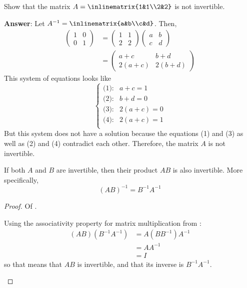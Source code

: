 \begin{exm}
	Show that the matrix $A=\inlinematrix{1&1\\2&2}$ is
	not invertible.
	\begin{flushleft}
		\textbf{Answer}: Let $A^{-1}=\inlinematrix{a&b\\c&d}$.
		Then,
		\begin{align*}
			\begin{pmatrix}
				1 & 0 \\
				0 & 1
			\end{pmatrix} & =
			\begin{pmatrix}
				1 & 1 \\
				2 & 2
			\end{pmatrix}\begin{pmatrix}
				a & b \\
				c & d
			\end{pmatrix}     \\
			                           & =\begin{pmatrix}
				a+c    & b+d    \\
				2(a+c) & 2(b+d)
			\end{pmatrix}
		\end{align*}
		This system of equations looks like
		\begin{equation*}
			\begin{cases}
				\text{(1):} & a+c=1    \\
				\text{(2):} & b+d=0    \\
				\text{(3):} & 2(a+c)=0 \\
				\text{(4):} & 2(a+c)=1 \\
			\end{cases}
		\end{equation*}
		But this system does not have a solution because the equations (1) and (3)
		as well as (2) and (4) contradict each other. Therefore, the matrix $A$
		is not invertible.
	\end{flushleft}
\end{exm}

\begin{thm}\label{thm-product-of-inverse-matrices}
	If both $A$ and $B$ are invertible, then their product $AB$ is also invertible.
	More specifically,
	\begin{equation}
		(AB)^{-1}=B^{-1}A^{-1}
	\end{equation}
\end{thm}

\begin{proof}
	Of .
	\begin{flushleft}
		Using the associativity property for matrix multiplication from
		:
		\begin{align*}
			(AB)(B^{-1}A^{-1}) & =A(BB^{-1})A^{-1} \\
			                   & =AA^{-1}          \\
			                   & =I
		\end{align*}
		so that means that $AB$ is invertible, and that its inverse is $B^{-1}A^{-1}$.
	\end{flushleft}
\end{proof}

